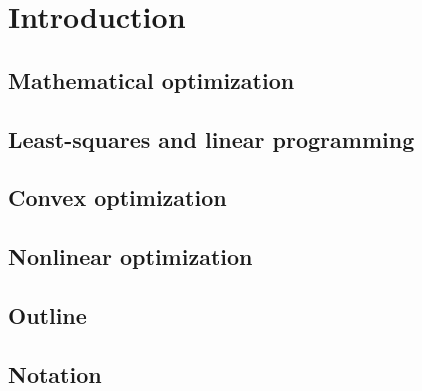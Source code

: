 \chapter{Introduction}

\section{Mathematical optimization}

\section{Least-squares and linear programming}

\section{Convex optimization}

\section{Nonlinear optimization}

\section{Outline}

\section{Notation}
